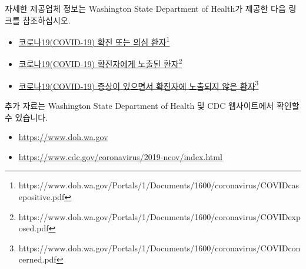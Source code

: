\documentclass[10pt]{article}
\newcommand{\link}[2]{\href{#1}{#2}\footnote{#1}}
\begin{document}
자세한 제공업체 정보는 Washington State Department of Health가 제공한 다음 링크를
참조하십시오.

\begin{itemize}
\item

  \link{https://www.doh.wa.gov/Portals/1/Documents/1600/coronavirus/COVIDcasepositive.pdf}{코로나19(COVID-19)
  확진 또는 의심 환자}

\item

  \link{https://www.doh.wa.gov/Portals/1/Documents/1600/coronavirus/COVIDexposed.pdf}{코로나19(COVID-19)
  확진자에게 노출된 환자}

\item

  \link{https://www.doh.wa.gov/Portals/1/Documents/1600/coronavirus/COVIDconcerned.pdf}{코로나19(COVID-19)
  증상이 있으면서 확진자에 노출되지 않은 환자}

\end{itemize}

추가 자료는 Washington State Department of Health 및 CDC 웹사이트에서 확인할 수 있습니다.

\begin{itemize}
\item

  \url{https://www.doh.wa.gov}

\item

  \url{https://www.cdc.gov/coronavirus/2019-ncov/index.html}

\end{itemize}
\end{document}

